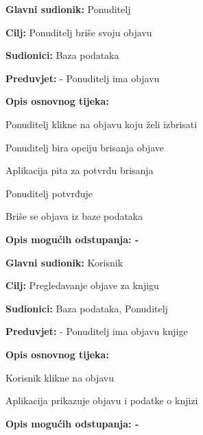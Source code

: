                     \noindent {}
					\begin{packed_item}
	
						\item \textbf{Glavni sudionik: } Ponuditelj
						\item  \textbf{Cilj:} Ponuditelj briše svoju objavu
						\item  \textbf{Sudionici:} Baza podataka
						\item  \textbf{Preduvjet:} - Ponuditelj ima objavu
						\item  \textbf{Opis osnovnog tijeka:}
						
						\item[] \begin{packed_enum}
	
							\item Ponuditelj klikne na objavu koju želi izbrisati
                            \item Ponuditelj bira opciju brisanja objave
							\item Aplikacija pita za potvrdu brisanja
                            \item Ponuditelj potvrđuje
                            \item Briše se objava iz baze podataka
						\end{packed_enum}
						
						\item  \textbf{Opis mogućih odstupanja: -}
					\end{packed_item}

                    \noindent {}
					\begin{packed_item}
	
						\item \textbf{Glavni sudionik: } Korisnik
						\item  \textbf{Cilj:} Pregledavanje objave za knjigu
						\item  \textbf{Sudionici:} Baza podataka, Ponuditelj
						\item  \textbf{Preduvjet:} - Ponuditelj ima objavu knjige
						\item  \textbf{Opis osnovnog tijeka:}
						
						\item[] \begin{packed_enum}
	
							\item Korisnik klikne na objavu
                            \item Aplikacija prikazuje objavu i podatke o knjizi
						\end{packed_enum}
						
						\item  \textbf{Opis mogućih odstupanja: -}
					\end{packed_item}


